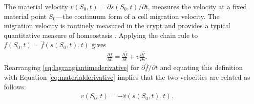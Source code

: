 The material velocity $v(S_0, t) = \partial s(S_0, t)/\partial t$, measures the velocity at a fixed material point $S_0$---the continuum form of a cell migration velocity. The migration velocity is routinely measured in the crypt and provides a typical quantitative measure of homeostasis \cite{kaur1986cell, krndija2019active}. Applying the chain rule to $f(S_0, t) = \hat{f}(s(S_0,t), t)$ gives
\begin{align}
\frac{\partial f}{\partial t} = \frac{\partial\hat{f}}{\partial t} + v\frac{\partial\hat{f}}{\partial s}.\label{eq:lagrangiantimederivative}
\end{align}
Rearranging \eqref{eq:lagrangiantimederivative} for $\partial\hat{f}/\partial t$ and equating this definition with Equation \eqref{eq:materialderivative} implies that the two velocities are related as follows:
\begin{align}
v(S_0, t) = -\hat{v}(s(S_0, t), t).\label{eq:currentvelocitydefn}
\end{align}

